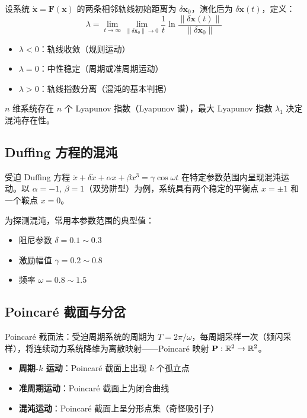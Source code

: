 \begin{definition}[Lyapunov 指数]
设系统 $\dot{\mathbf{x}} = \mathbf{F}(\mathbf{x})$ 的两条相邻轨线初始距离为 $\delta \mathbf{x}_0$，演化后为 $\delta\mathbf{x}(t)$，定义：
\[
\lambda = \lim_{t\to\infty}\lim_{\|\delta\mathbf{x}_0\|\to 0} \frac{1}{t}\ln\frac{\|\delta\mathbf{x}(t)\|}{\|\delta\mathbf{x}_0\|}
\]
\begin{itemize}
    \item $\lambda < 0$：轨线收敛（规则运动）
    \item $\lambda = 0$：中性稳定（周期或准周期运动）
    \item $\lambda > 0$：轨线指数分离（混沌的基本判据）
\end{itemize}
$n$ 维系统存在 $n$ 个 Lyapunov 指数（Lyapunov 谱），最大 Lyapunov 指数 $\lambda_1$ 决定混沌存在性。
\end{definition}

\subsection{Duffing 方程的混沌}
受迫 Duffing 方程 $\ddot{x} + \delta\dot{x} + \alpha x + \beta x^{3} = \gamma\cos\omega t$ 在特定参数范围内呈现混沌运动。以 $\alpha = -1$, $\beta = 1$（双势阱型）为例，系统具有两个稳定的平衡点 $x = \pm 1$ 和一个鞍点 $x = 0$。

为探测混沌，常用本参数范围的典型值：
\begin{itemize}
    \item 阻尼参数 $\delta = 0.1 \sim 0.3$
    \item 激励幅值 $\gamma = 0.2 \sim 0.8$
    \item 频率 $\omega = 0.8 \sim 1.5$
\end{itemize}

\subsection{Poincar\'e 截面与分岔}
Poincar\'e 截面法：受迫周期系统的周期为 $T = 2\pi/\omega$，每周期采样一次（频闪采样），将连续动力系统降维为离散映射——Poincar\'e 映射 $\mathbf{P}: \mathbb{R}^{2} \to \mathbb{R}^{2}$。

\begin{itemize}
    \item \textbf{周期-$k$ 运动}：Poincar\'e 截面上出现 $k$ 个孤立点
    \item \textbf{准周期运动}：Poincar\'e 截面上为闭合曲线
    \item \textbf{混沌运动}：Poincar\'e 截面上呈分形点集（奇怪吸引子）
\end{itemize}

